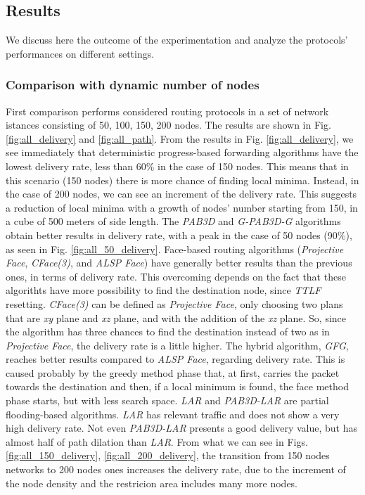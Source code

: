 \documentclass[journal,comsoc]{IEEEtran}
\begin{document}
\subsection{Results}
We discuss here the outcome of the experimentation and analyze the protocols' performances on different settings.
\subsubsection{Comparison with dynamic number of nodes}
First comparison performs considered routing protocols in a set of network istances consisting of 50, 100, 150, 200 nodes. The results are shown in Fig. \ref{fig:all_delivery} and \ref{fig:all_path}. From the results in Fig. \ref{fig:all_delivery}, we see immediately that deterministic progress-based forwarding algorithms have the lowest delivery rate, less than 60\% in the case of 150 nodes. This means that in this scenario (150 nodes) there is more chance of finding local minima. Instead, in the case of 200 nodes, we can see an increment of the delivery rate. This suggests a reduction of local minima with a growth of nodes' number starting from 150, in a cube of 500 meters of side length. The \emph{PAB3D} and \emph{G-PAB3D-G} algorithms obtain better results in delivery rate, with a peak in the case of 50 nodes (90\%), as seen in Fig. \ref{fig:all_50_delivery}. Face-based routing algorithms (\emph{Projective Face}, \emph{CFace(3)}, and \emph{ALSP Face}) have generally better results than the previous ones, in terms of delivery rate. This overcoming depends on the fact that these algorithts have more possibility to find the destination node, since \emph{TTLF} resetting. \emph{CFace(3)} can be defined as \emph{Projective Face}, only choosing two plans that are \emph{xy} plane and \emph{xz} plane, and with the addition of the \emph{xz} plane. So, since the algorithm has three chances to find the destination instead of two as in \emph{Projective Face}, the delivery rate is a little higher. The hybrid algorithm, \emph{GFG}, reaches better results compared to \emph{ALSP Face}, regarding delivery rate. This is caused probably by the greedy method phase that, at first, carries the packet towards the destination and then, if a local minimum is found, the face method phase starts, but with less search space. \emph{LAR} and \emph{PAB3D-LAR} are partial flooding-based algorithms. \emph{LAR} has relevant traffic and does not show a very high delivery rate. Not even \emph{PAB3D-LAR} presents a good delivery value, but has almost half of path dilation than \emph{LAR}. From what we can see in Figs. \ref{fig:all_150_delivery}, \ref{fig:all_200_delivery}, the transition from 150 nodes networks to 200 nodes ones increases the delivery rate, due to the increment of the node density and the restricion area includes many more nodes.
\end{document}
